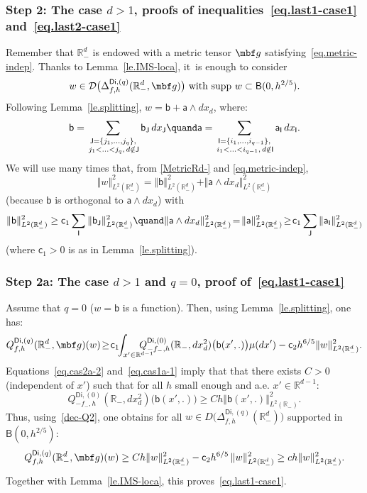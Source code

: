 \subsubsection*{Step 2: The case $d>1$, proofs of
inequalities~\eqref{eq.last1-case1} and~\eqref{eq.last2-case1}}
Remember that $\mathbb R^d_-$ is endowed with a metric tensor $ \mbf
g$ satisfying~\eqref{eq.metric-indep}. Thanks to
Lemma~\ref{le.IMS-loca}, it~is enough to consider
\[
w\in \mathcal D \bigl(\Delta^{\mathsf{Di},(q)}_{f,h}(\mathbb R_-^d,
\mbf g)\bigr) \text{ with supp } w\subset \mathsf B(0,h^{2/5}).
\]
Following Lemma~\ref{le.splitting}, $w=\mathsf b + \mathsf a \wedge dx_d$, where:\[
\mathsf b =\sum_{\substack{\mathsf J=\{j_1,\ldots,j_q\},\\ \, j_1<\ldots<j_q, \, d\notin \mathsf J} } \mathsf b_{\mathsf J}\, dx_{\mathsf J} \quand \mathsf a =\sum_{\substack{\mathsf I=\{i_1,\ldots,i_{q-1}\},\\ \, i_1<\ldots<i_{q-1}, \, d\notin \mathsf I }} \mathsf a_{\mathsf I}\, dx_{\mathsf I}.
\]
We will use many times that, from \ref{MetricRd-} and \eqref{eq.metric-indep},
\[
\Vert w \Vert_{L^2(\mathbb R^d_-)}^2= \Vert \mathsf b
\Vert_{L^2(\mathbb R^d_-)}^2+ \Vert \mathsf a \wedge dx_d
\Vert_{L^2(\mathbb R^d_-)}^2
\]
(because $\mathsf b $ is orthogonal
to $\mathsf a \wedge dx_d$) with
\[
\Vert \mathsf b
\Vert_{L^2(\mathbb R^d_-)}^2\ge \mathsf c_1 \sum_{\mathsf I}
\Vert \mathsf b_{\mathsf J} \Vert_{L^2(\mathbb R^d_-)}^2\quand \Vert \mathsf a \wedge dx_d \Vert_{L^2(\mathbb R^d_-)}^2 \! =\! \Vert \mathsf a \Vert_{L^2(\mathbb R^d_-)}^2 \!\ge \! \mathsf c_1 \sum_{\mathsf J} \Vert \mathsf a_{\mathsf I} \Vert_{L^2(\mathbb R^d_-)}^2
\]
(where $\mathsf c_1 >0$ is as in Lemma~\ref{le.splitting}).

\subsubsection*{Step 2a: The case $d>1$ and $q= 0$, proof of~\eqref{eq.last1-case1}}
Assume that $q= 0$ (\ie $w=\mathsf b$ is a function). Then, using Lemma~\ref{le.splitting}, one has:
\begin{align}\label{dec-Q2}
Q^{\mathsf{Di},(q)}_{f,h}(\mathbb R^{d}_-, \mbf g)(w)\!\ge\! \mathsf
c_1\!\! \int_{x'\in \mathbb R^{d-1} } \!\!\! \!\!\! \!\!\! \! Q^{\mathsf{Di},(0)}_{-f_-,h}(\mathbb R_-,dx_d^2)\bigl(\mathsf b(x',.)\bigr) \mu(dx')-\mathsf c_2h^{6/5} \Vert w \Vert_{L^2(\mathbb R^d_-)}^2.
\end{align}
Equations~\eqref{eq.cas2a-2} and~\eqref{eq.cas1a-1} imply that that there exists $C>0$ (independent of $x'$) such that for all $h$ small enough and a.e. $x'\in \mathbb R^{d-1}$:
\[
Q^{\mathsf{Di},(0)}_{-f_-,h}(\mathbb R_-,dx_d^2)\bigl(\mathsf b (x',.)\bigr) \ge Ch \Vert \mathsf b (x',.) \Vert_{L^2(\mathbb R_-)}^2.
\]
Thus, using~\eqref{dec-Q2}, one obtains for all $w\in D\bigl(\Delta_{f,h}^{\mathsf{Di},(q)}(\mathbb R_-^d) \bigr)$ supported in $\mathsf B(0,h^{2/5 })$:
\[
Q^{\mathsf{Di},(q)}_{f,h}(\mathbb R_-^d, \mbf g)(w)\ge Ch \Vert w \Vert_{L^2(\mathbb R^d_-)}^2-\mathsf c_2h^{6/5}\, \Vert w \Vert_{L^2(\mathbb R^d_-)}^2\ge ch \Vert w \Vert_{L^2(\mathbb R^d_-)}^2.
\]
Together with Lemma~\ref{le.IMS-loca}, this proves~\eqref{eq.last1-case1}.

